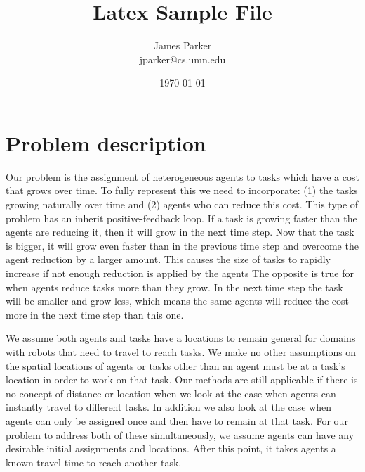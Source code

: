 \documentclass[11pt]{article}
\title{Latex Sample File}
\author{
James Parker\\jparker@cs.umn.edu
}
\date{\today}
\begin{document}
\maketitle

\section{Problem description}
Our problem is the assignment of heterogeneous agents to tasks
which have a cost that grows over time.  
To fully represent this we need to incorporate:
(1) the tasks growing naturally over time and
(2) agents who can reduce this cost.
This type of problem has an inherit positive-feedback loop.
If a task is growing faster than the agents are reducing it,
then it will grow in the next time step.
Now that the task is bigger, it will grow even faster
than in the previous time step and overcome the
agent reduction by a larger amount.
This causes the size of tasks to rapidly increase
if not enough reduction is applied by the agents
The opposite is true for when agents reduce tasks
more than they grow.
In the next time step the task will be smaller
and grow less,
which means the same agents will reduce the cost more
in the next time step than this one.

We assume both agents and tasks have a locations to remain general
for domains with robots that need to travel to reach tasks.
We make no other assumptions
on the spatial locations of agents or tasks other than an
agent must be at a task's location in order to work on that task.
Our methods are still applicable if there is no concept of distance
or location when we look at the case when agents can instantly travel to 
different tasks.
In addition we also look at the case when agents can only be assigned once
and then have to remain at that task.
For our problem to address both of these simultaneously, 
we assume agents can have any desirable initial assignments and locations. 
After this point, it takes agents a known travel time to reach another task.
\end{document}
